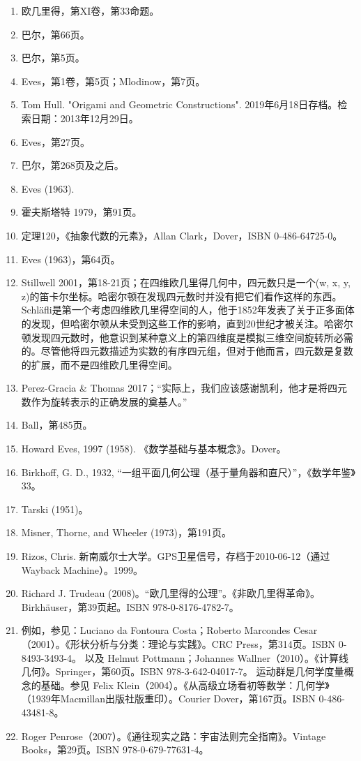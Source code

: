 \begin{enumerate}
\item 欧几里得，第XI卷，第33命题。  
\item 巴尔，第66页。  
\item 巴尔，第5页。  
\item Eves，第1卷，第5页；Mlodinow，第7页。  
\item Tom Hull. "Origami and Geometric Constructions". 2019年6月18日存档。检索日期：2013年12月29日。  
\item Eves，第27页。  
\item 巴尔，第268页及之后。
\item Eves (1963).  
\item 霍夫斯塔特 1979，第91页。  
\item 定理120，《抽象代数的元素》，Allan Clark，Dover，ISBN 0-486-64725-0。  
\item Eves (1963)，第64页。  
\item Stillwell 2001，第18-21页；在四维欧几里得几何中，四元数只是一个(w, x, y, z)的笛卡尔坐标。哈密尔顿在发现四元数时并没有把它们看作这样的东西。Schläfli是第一个考虑四维欧几里得空间的人，他于1852年发表了关于正多面体的发现，但哈密尔顿从未受到这些工作的影响，直到20世纪才被关注。哈密尔顿发现四元数时，他意识到某种意义上的第四维度是模拟三维空间旋转所必需的。尽管他将四元数描述为实数的有序四元组，但对于他而言，四元数是复数的扩展，而不是四维欧几里得空间。
\item Perez-Gracia & Thomas 2017；“实际上，我们应该感谢凯利，他才是将四元数作为旋转表示的正确发展的奠基人。”  
\item Ball，第485页。  
\item Howard Eves, 1997 (1958). 《数学基础与基本概念》。Dover。  
\item Birkhoff, G. D., 1932, “一组平面几何公理（基于量角器和直尺）”，《数学年鉴》33。  
\item Tarski (1951)。  
\item Misner, Thorne, and Wheeler (1973)，第191页。  
\item Rizos, Chris. 新南威尔士大学。GPS卫星信号，存档于2010-06-12（通过Wayback Machine）。1999。  
\item Richard J. Trudeau (2008)。“欧几里得的公理”。《非欧几里得革命》。Birkhäuser，第39页起。ISBN 978-0-8176-4782-7。
\item 例如，参见：Luciano da Fontoura Costa；Roberto Marcondes Cesar（2001）。《形状分析与分类：理论与实践》。CRC Press，第314页。ISBN 0-8493-3493-4。  
以及 Helmut Pottmann；Johannes Wallner（2010）。《计算线几何》。Springer，第60页。ISBN 978-3-642-04017-7。  
运动群是几何学度量概念的基础。参见 Felix Klein（2004）。《从高级立场看初等数学：几何学》（1939年Macmillan出版社版重印）。Courier Dover，第167页。ISBN 0-486-43481-8。  
\item Roger Penrose（2007）。《通往现实之路：宇宙法则完全指南》。Vintage Books，第29页。ISBN 978-0-679-77631-4。
\end{enumerate}
